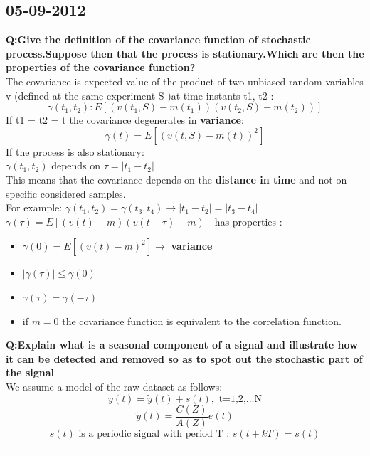 \documentclass[12pt]{article} %
\begin{document}
\subsection{05-09-2012}
\textbf{Q:Give the definition of the covariance function of stochastic process.Suppose then that the process is stationary.Which are then the properties of the covariance function?}\vspace{2mm}\\
The covariance is expected value of the product of two unbiased random variables v (defined at the same experiment S )at time instants t1, t2 :$$ \gamma(t_1,t_2) : E[ ( v(t_1,S) - m(t_1))(v(t_2,S)-m(t_2))] $$If t1 = t2 = t the covariance degenerates in \textbf{variance}: $$ \gamma(t) = E [ (v(t,S)- m(t))^2] $$
If the process is also stationary:\\
$ \gamma(t_1,t_2) $ depends on $ \tau = | t_1 - t_2 | $ \\ This means that the covariance depends on the \textbf{distance in time} and not on specific considered samples.\\For example:
   $ \gamma(t_1,t_2)= \gamma(t_3,t_4) \rightarrow |t_1-t_2|=|t_3-t_4|$ \\
   $ \gamma(\tau) = E[ (v(t) - m)(v(t-\tau)-m)] $ has properties :
   \begin{itemize}
   \item $ \gamma(0) = E[(v(t)-m)^2] \rightarrow$ \textbf{variance}
   \item $ |\gamma(\tau)| \leq \gamma(0) $
   \item $ \gamma(\tau) = \gamma(- \tau)$
   \item if $m=0$ the covariance function is equivalent to the correlation function.
   \end{itemize}
\vspace{8mm}
\textbf{Q:Explain what is a seasonal component of a signal and illustrate how it can be detected and removed so as to spot out the stochastic part of the signal}
\vspace{2mm}\\
We assume a model of the raw dataset as follows:
$$ y(t) = \tilde{y}(t) + s(t) ,\text{ t=1,2,...N}$$
$$ \tilde{y}(t) = \frac{C(Z)}{A(Z)}e(t)$$
$$ s(t) \text{ is a periodic signal with period T : } s(t+kT)=s(t)$$
\par\noindent\rule{\textwidth}{0.4pt}
\end{document}
